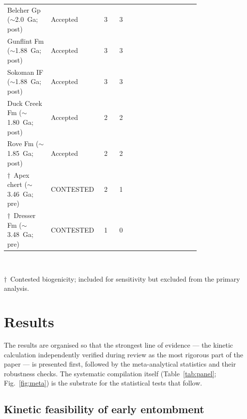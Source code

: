 \documentclass[11pt]{article}
\begin{document}
\begin{table}[t]
\begin{tabular}{p{0.205\linewidth}p{0.135\linewidth}p{0.075\linewidth}p{0.075\linewidth}p{0.30\linewidth}}
\midrule
Belcher Gp ($\sim$2.0~Ga; post) & Accepted & 3 & 3 & \citep{Javaux2018} \\
Gunflint Fm ($\sim$1.88~Ga; post) & Accepted & 3 & 3 & \citep{Lepot2017a,Wacey2013,Alleon2016a} \\
Sokoman IF ($\sim$1.88~Ga; post) & Accepted & 3 & 3 & \citep{Javaux2018} \\
Duck Creek Fm ($\sim$1.80~Ga; post) & Accepted & 2 & 2 & \citep{Javaux2018,Wacey2014} \\
Rove Fm ($\sim$1.85~Ga; post) & Accepted & 2 & 2 & \citep{Javaux2018,Wacey2014} \\
\midrule
$\dagger$~Apex chert ($\sim$3.46~Ga; pre) & CONTESTED & 2 & 1 & \citep{Schopf1993,Brasier2002,Wacey2014} \\
$\dagger$~Dresser Fm ($\sim$3.48~Ga; pre) & CONTESTED & 1 & 0 & \citep{Wacey2014} \\
\bottomrule
\end{tabular}
\\[2pt]
\raggedright\scriptsize $\dagger$~Contested biogenicity; included for sensitivity but excluded from
the primary analysis.
\end{table}

\section{Results}

The results are organised so that the strongest line of evidence --- the kinetic calculation
independently verified during review as the most rigorous part of the paper --- is presented first,
followed by the meta-analytical statistics and their robustness checks. The systematic compilation
itself (Table~\ref{tab:panel}; Fig.~\ref{fig:meta}) is the substrate for the statistical tests that
follow.

\subsection{Kinetic feasibility of early entombment}
\end{document}
